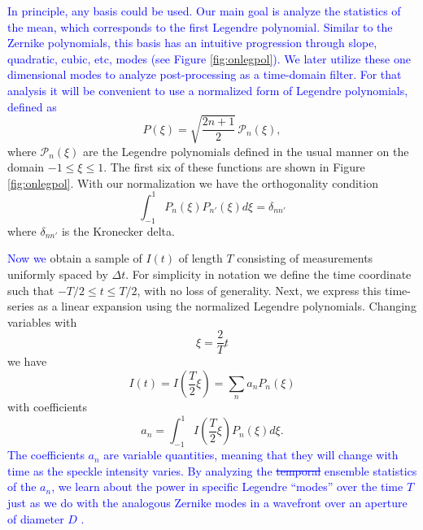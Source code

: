 \documentclass[10pt,preprint]{aastex631}
\newcommand{\jrmadd}[1]{\textcolor{blue}{#1}}
\newcommand{\jrmrmv}[1]{\textcolor{blue}{\sout{#1}}}
\begin{document}
\jrmadd{In principle, any basis could be used.  Our main goal is analyze the statistics of the mean, which corresponds to the first Legendre polynomial.  Similar to the Zernike polynomials, this basis has an intuitive progression through slope, quadratic, cubic, etc, modes (see Figure \ref{fig:onlegpol}). We later utilize these one dimensional modes to analyze post-processing as a time-domain filter.  For that analysis it will be convenient to use a normalized form of Legendre polynomials, defined as}
\begin{equation}
P(\xi) = \sqrt{\frac{2n+1}{2}}\, \mathscr{P}_n(\xi),
\label{eqn:basis}
\end{equation}
where $\mathscr{P}_n(\xi)$ are the Legendre polynomials defined in the usual manner \citep[cf.][]{Olver:2010:NHMF} on the domain $-1 \le \xi \le 1$. The first six of these functions are shown in Figure \ref{fig:onlegpol}.  With our normalization we have the orthogonality condition
\begin{equation}
\int_{-1}^{1}P_n(\xi)P_{n'}(\xi) d\xi = \delta_{nn'}
\label{eqn:orthonormal}
\end{equation}
where $\delta_{nn'}$ is the Kronecker delta. 


\jrmadd{Now we} obtain a sample of $I(t)$ of length $T$ consisting of measurements uniformly spaced by $\Delta t$.  For simplicity in notation we define the time coordinate such that $-T/2 \le t \le T/2$, with no loss of generality.  Next, we express this time-series as a linear expansion using the normalized Legendre polynomials.  Changing variables with
\begin{equation}
\xi = \frac{2}{T}t
\end{equation}
we have
\begin{equation}
I(t) = I\left(\frac{T}{2}\xi\right) = \sum_n a_n P_n(\xi)
\label{eqn:basisexpansion}
\end{equation}
with coefficients
\begin{equation}
a_n = \int_{-1}^{1} I\left(\frac{T}{2}\xi\right)P_n(\xi) d\xi.
\label{eqn:expansecoeff}
\end{equation}
\jrmadd{The coefficients $a_n$ are variable quantities, meaning that they will change with time as the speckle intensity varies.  By analyzing the} \jrmrmv{temporal} \jrmadd{ensemble statistics of the $a_n$, we learn about the power in specific Legendre ``modes'' over the time $T$ just as we do with the analogous Zernike modes in a wavefront over an aperture of diameter $D$ \citep{1976JOSA...66..207N}.}
\end{document}
